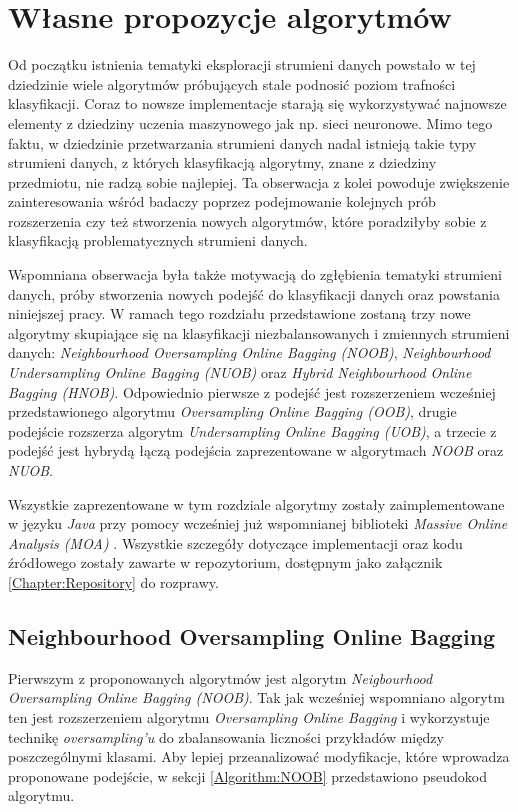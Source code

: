 \chapter{Własne propozycje algorytmów}

\noindent Od początku istnienia tematyki eksploracji strumieni danych powstało w tej dziedzinie wiele algorytmów próbujących stale podnosić poziom trafności klasyfikacji. Coraz to nowsze implementacje starają się wykorzystywać najnowsze elementy z dziedziny uczenia maszynowego jak np. sieci neuronowe. Mimo tego faktu, w dziedzinie przetwarzania strumieni danych nadal istnieją takie typy strumieni danych, z których klasyfikacją algorytmy, znane z dziedziny przedmiotu, nie radzą sobie najlepiej. Ta obserwacja z kolei powoduje zwiększenie zainteresowania wśród badaczy poprzez podejmowanie kolejnych prób rozszerzenia czy też stworzenia nowych algorytmów, które poradziłyby sobie z klasyfikacją problematycznych strumieni danych.

Wspomniana obserwacja była także motywacją do zgłębienia tematyki strumieni danych, próby stworzenia nowych podejść do klasyfikacji danych oraz powstania niniejszej pracy. W ramach tego rozdziału przedstawione zostaną trzy nowe algorytmy skupiające się na klasyfikacji niezbalansowanych i zmiennych strumieni danych: \textit{Neighbourhood Oversampling Online Bagging (NOOB)}, \textit{Neighbourhood Undersampling Online Bagging (NUOB)} oraz \textit{Hybrid Neighbourhood Online Bagging (HNOB)}. Odpowiednio pierwsze z podejść jest rozszerzeniem wcześniej przedstawionego algorytmu \textit{Oversampling Online Bagging (OOB)}, drugie podejście rozszerza algorytm \textit{Undersampling Online Bagging (UOB)}, a trzecie z podejść jest hybrydą łączą podejścia zaprezentowane w algorytmach \textit{NOOB} oraz \textit{NUOB}.

Wszystkie zaprezentowane w tym rozdziale algorytmy zostały zaimplementowane w języku \textit{Java} przy pomocy wcześniej już wspomnianej biblioteki \textit{Massive Online Analysis (MOA)} \cite{Article:MOA}. Wszystkie szczegóły dotyczące implementacji oraz kodu źródłowego zostały zawarte w repozytorium, dostępnym jako załącznik \ref{Chapter:Repository} do rozprawy.

\newpage

\section{Neighbourhood Oversampling Online Bagging}

\noindent Pierwszym z proponowanych algorytmów jest algorytm \textit{Neigbourhood Oversampling Online Bagging (NOOB)}. Tak jak wcześniej wspomniano algorytm ten jest rozszerzeniem algorytmu \textit{Oversampling Online Bagging} i wykorzystuje technikę \textit{oversampling'u} do zbalansowania liczności przykładów między poszczególnymi klasami. Aby lepiej przeanalizować modyfikacje, które wprowadza proponowane podejście, w sekcji \ref{Algorithm:NOOB} przedstawiono pseudokod algorytmu.

